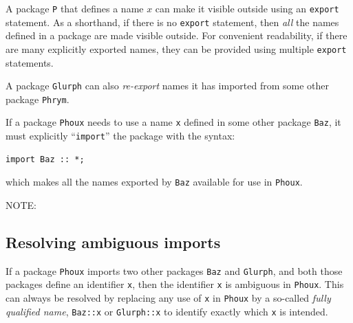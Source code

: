 
A package \verb|P| that defines a name $x$ can make it visible outside
using an \verb|export| statement.  As a shorthand, if there is no
\verb|export| statement, then \emph{all} the names defined in a
package are made visible outside.  For convenient readability, if
there are many explicitly exported names, they can be provided using
multiple \verb|export| statements.

A package \verb|Glurph| can also \emph{re-export} names it has
imported from some other package \verb|Phrym|.

If a package \verb|Phoux| needs to use a name \verb|x| defined in some
other package \verb|Baz|, it must explicitly ``\verb|import|'' the
package with the syntax:

{\small
\begin{Verbatim}[frame=single]
import Baz :: *;
\end{Verbatim}
}

which makes all the names exported by \verb|Baz| available for use in
\verb|Phoux|.

\vspace{2ex}

NOTE:


\subsection{Resolving ambiguous imports}


If a package \verb|Phoux| imports two other packages \verb|Baz| and
\verb|Glurph|, and both those packages define an identifier \verb|x|,
then the identifier \verb|x| is ambiguous in \verb|Phoux|.  This can
always be resolved by replacing any use of \verb|x| in \verb|Phoux| by
a so-called \emph{fully qualified name}, \verb|Baz::x| or
\verb|Glurph::x| to identify exactly which \verb|x| is intended.

